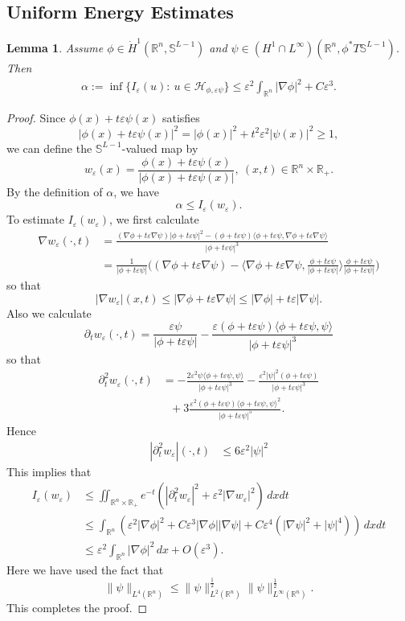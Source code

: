 \documentclass[12pt,twoside,reqno]{amsart}
\newtheorem{lemma}[theorem]{Lemma}
\theoremstyle{definition}              %
\theoremstyle{remark}                  %
\newcommand{\R}{\mathbb{R}}                 %
\newcommand{\eps}{\varepsilon}
\renewcommand{\1}{\mathbbm{1}}                                      %
\numberwithin{equation}{section}
\numberwithin{definition}{section}
\numberwithin{theorem}{section}
\numberwithin{remark}{section}
\begin{document}
\subsection{Uniform Energy Estimates}
\begin{lemma} \label{nonempty} Assume $\phi\in \dot{H}^1(\mathbb R^n,\mathbb S^{L-1})$ 
and $\psi\in ({H}^1\cap L^\infty)(\mathbb R^n,\mathbb \phi^*T\mathbb{S}^{L-1})$.
Then 
\begin{align}\label{energy_ineq1}
\alpha:=\inf\Big\{I_\eps(u):\  u\in \mathcal{H}_{\phi,\eps\psi}\Big\}
\le \eps^2\int_{\mathbb{R}^n}
|\nabla\phi|^2+C\eps^3.  
\end{align}
\end{lemma}
\begin{proof} Since 
$\phi(x)+t\eps \psi(x)$ satisfies
$$
|\phi(x)+t\eps \psi(x)|^2=
|\phi(x)|^2+t^2\eps^2|\psi(x)|^2
\ge 1,
$$
we can define the $\mathbb{S}^{L-1}$-valued map by
$$w_\eps(x)=\displaystyle\frac{\phi(x)+t\eps \psi(x)}
{|\phi(x)+t\eps \psi(x)|}, \ (x,t)\in\R^n\times\mathbb R_+.
$$
By the definition of $\alpha$, we have
$$
\alpha\le I_\eps(w_\eps).
$$
To estimate $I_\eps(w_\eps)$,
we first calculate
\begin{align*}
\nabla w_\eps(\cdot,t)&=
\frac{(\nabla\phi+t\eps\nabla\psi)
|\phi+t\eps\psi|^2-(\phi+t\eps\psi)\langle\phi+t\eps\psi,\nabla\phi+t\eps\nabla\psi\rangle}
{|\phi+t\eps\psi|^3}\\
&=\frac{1}{|\phi+t\eps\psi|}\Big(
(\nabla\phi+t\eps\nabla\psi)-
\langle \nabla\phi+t\eps\nabla\psi, \frac{\phi+t\eps\psi}{|\phi+t\eps\psi|}\rangle\frac{\phi+t\eps\psi}{|\phi+t\eps\psi|}\Big)
\end{align*}
so that
$$
|\nabla w_\eps|(x,t)
\le |\nabla\phi+t\eps\nabla\psi|
\le |\nabla\phi|+t\eps|\nabla\psi|.
$$
Also we calculate
$$
\partial_tw_\eps(\cdot,t)
=\frac{\eps\psi}{|\phi+t\eps\psi|}
-\frac{\eps (\phi+t\eps\psi)\langle \phi+t\eps\psi,\psi\rangle}{|\phi+t\eps\psi|^3}
$$
so that
\begin{align*}
 \partial_t^2w_\eps(\cdot, t)
 &=-\frac{2\eps^2\psi\langle \phi+t\eps\psi,\psi\rangle}{|\phi+t\eps\psi|^3}
 -\frac{\eps^2|\psi|^2(\phi+t\eps\psi)}
 {|\phi+t\eps\psi|^3}\\ &\ \ \ +3\frac{\eps^2(\phi+t\eps\psi)\langle \phi+t\eps\psi,\psi\rangle^2}
 {|\phi+t\eps\psi|^5}.
\end{align*}
Hence
\begin{align*}
|\partial_t^2w_\eps|(\cdot, t)
&\le 6\eps^2|\psi|^2
\end{align*}
This implies that 
\begin{align*}
I_\eps(w_\eps)
 &\le  \iint_{\mathbb{R}^n\times\R_+} e^{-t}(|\partial_t^2w_\eps|^2+\eps^2|\nabla w_\eps|^2)\,dxdt\\
 &\le \int_{\mathbb{R}^n}
(\eps^2|\nabla\phi|^2+C\eps^3|\nabla\phi||\nabla\psi|+C\eps^4 (|\nabla\psi|^2+|\psi|^4))\,dxdt\\
&\le\eps^2\int_{\mathbb{R}^n}|\nabla\phi|^2\,dx+O(\eps^3).
\end{align*}
Here we have used the fact that
\[
\|\psi\|_{L^4(\R^n)}\le \|\psi\|_{L^2(\R^n)}^\frac12
\|\psi\|_{L^\infty(\R^n)}^\frac12.
\]
This completes the proof. \end{proof} 
\end{document}
